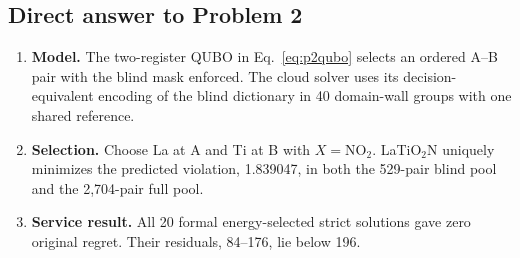 \subsection{Direct answer to Problem 2}\label{sec:p2answer}
\begin{enumerate}
\item \textbf{Model.} The two-register QUBO in Eq.~\eqref{eq:p2qubo} selects an ordered A--B pair with the blind mask enforced. The cloud solver uses its decision-equivalent encoding of the blind dictionary in 40 domain-wall groups with one shared reference.
\item \textbf{Selection.} Choose La at A and Ti at B with $X=\mathrm{NO_2}$. LaTiO$_2$N uniquely minimizes the predicted violation, 1.839047, in both the 529-pair blind pool and the 2,704-pair full pool.
\item \textbf{Service result.} All 20 formal energy-selected strict solutions gave zero original regret. Their residuals, 84--176, lie below 196.
\end{enumerate}
